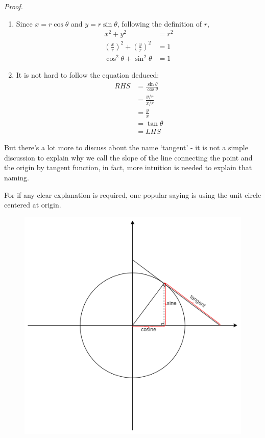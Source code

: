 \documentclass[12pt]{article}
\renewenvironment{proof}[1][Proof]{\begin{snugshade*} \textit{{#1}.}\\}{\hfill \qedsymbol \end{snugshade*}}
\begin{document}
    \begin{proof}
        \begin{enumerate}
            \item Since $x=r\cos{\theta}$ and $y=r\sin{\theta}$, following the definition of $r$, \begin{align*}
                x^2+y^2&=r^2\\
                (\frac{x}{r})^2+(\frac{y}{r})^2&=1\\
                \cos^2{\theta}+\sin^2{\theta}&=1
            \end{align*}
            \item It is not hard to follow the equation deduced:\begin{align*}
                RHS&=\frac{\sin{\theta}}{\cos{\theta}}\\
                &=\frac{y/r}{x/r}\\
                &=\frac{y}{x}\\
                &=\tan{\theta}\\
                &=LHS
            \end{align*}
        \end{enumerate}
    \end{proof}

    But there's a lot more to discuss about the name `tangent' - it is not a simple discussion to explain why we call the slope of the line connecting the point and the origin by tangent function, in fact, more intuition is needed to explain that naming.

    For if any clear explanation is required, one popular saying is using the unit circle centered at origin.

    \begin{figure}[H]
        \centering
        \includegraphics[scale=0.8]{trigo_on_circle.png}
    \end{figure}
\end{document}
